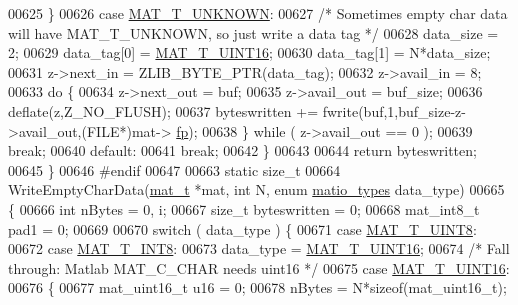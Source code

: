 \begin{DoxyCode}
{{{{00625         \}
00626         \textcolor{keywordflow}{case} \hyperlink{group___m_a_t_ggacf7b3b879282b7ab3a51190e49bf3453a2a7318fe8bf9464935e7ed8902618293}{MAT\_T\_UNKNOWN}:
00627             \textcolor{comment}{/* Sometimes empty char data will have MAT\_T\_UNKNOWN, so just write a data tag */}
00628             data\_size = 2;
00629             data\_tag[0] = \hyperlink{group___m_a_t_ggacf7b3b879282b7ab3a51190e49bf3453a05bc7af7680aa68be95126ae0a4c2e31}{MAT\_T\_UINT16};
00630             data\_tag[1] = N*data\_size;
00631             z->next\_in  = ZLIB\_BYTE\_PTR(data\_tag);
00632             z->avail\_in = 8;
00633             \textcolor{keywordflow}{do} \{
00634                 z->next\_out  = buf;
00635                 z->avail\_out = buf\_size;
00636                 deflate(z,Z\_NO\_FLUSH);
00637                 byteswritten += fwrite(buf,1,buf\_size-z->avail\_out,(FILE*)mat->
      \hyperlink{struct__mat__t_a85f562e407ca9ad4d2a6e14f839432b7}{fp});
00638             \} \textcolor{keywordflow}{while} ( z->avail\_out == 0 );
00639             \textcolor{keywordflow}{break};
00640         \textcolor{keywordflow}{default}:
00641             \textcolor{keywordflow}{break};
00642     \}
00643 
00644     \textcolor{keywordflow}{return} byteswritten;
00645 \}
00646 \textcolor{preprocessor}{#endif}
00647 
00663 \textcolor{keyword}{static} \textcolor{keywordtype}{size\_t}
00664 WriteEmptyCharData(\hyperlink{struct__mat__t}{mat\_t} *mat, \textcolor{keywordtype}{int} N, \textcolor{keyword}{enum} \hyperlink{group___m_a_t_gacf7b3b879282b7ab3a51190e49bf3453}{matio\_types} data\_type)
00665 \{
00666     \textcolor{keywordtype}{int} nBytes = 0, i;
00667     \textcolor{keywordtype}{size\_t} byteswritten = 0;
00668     mat\_int8\_t pad1 = 0;
00669 
00670     \textcolor{keywordflow}{switch} ( data\_type ) \{
00671         \textcolor{keywordflow}{case} \hyperlink{group___m_a_t_ggacf7b3b879282b7ab3a51190e49bf3453a01c1bd7db68f90552862eb5d311be408}{MAT\_T\_UINT8}:
00672         \textcolor{keywordflow}{case} \hyperlink{group___m_a_t_ggacf7b3b879282b7ab3a51190e49bf3453a9807f5033ed4f9b548953742d9fd1658}{MAT\_T\_INT8}:
00673             data\_type = \hyperlink{group___m_a_t_ggacf7b3b879282b7ab3a51190e49bf3453a05bc7af7680aa68be95126ae0a4c2e31}{MAT\_T\_UINT16};
00674             \textcolor{comment}{/* Fall through: Matlab MAT\_C\_CHAR needs uint16 */}
00675         \textcolor{keywordflow}{case} \hyperlink{group___m_a_t_ggacf7b3b879282b7ab3a51190e49bf3453a05bc7af7680aa68be95126ae0a4c2e31}{MAT\_T\_UINT16}:
00676         \{
00677             mat\_uint16\_t u16 = 0;
00678             nBytes = N*\textcolor{keyword}{sizeof}(mat\_uint16\_t);
}}}}
\end{DoxyCode}
